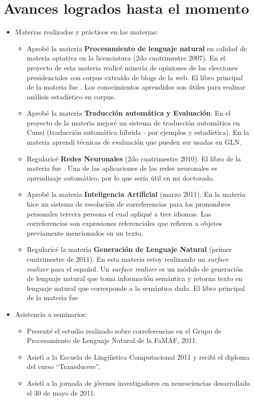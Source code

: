 \section{Avances logrados hasta el momento}
\label{progreso}
\begin{itemize}
\item Materias realizadas y pr\'acticos en las materias:
\begin{itemize}
\item Aprob\'e la materia {\bf Procesamiento de lenguaje natural} en calidad de materia optativa en la licenciatura (2do cuatrimestre 2007). En el proyecto de esta materia realic\'e miner\'ia de opiniones de las elecciones presidenciales con corpus extra\'ido de blogs de la web. El libro principal de la materia fue \cite{Manning2000}. Los conocimientos aprendidos son \'utiles para realizar an\'alisis estad\'istico en corpus.
\item Aprob\'e la materia {\bf Traducci\'on autom\'atica y Evaluaci\'on}. En el proyecto de la materia mejor\'e un sistema de traducci\'on autom\'atica en Cunei (traducci\'on autom\'atica h\'ibrida - por ejemplos y estad\'istica).
En la materia aprend\'i t\'ecnicas de evaluaci\'on que pueden ser usadas en GLN. 
\item Regularic\'e {\bf Redes Neuronales} (2do cuatrimestre 2010). El libro de la materia fue \cite{Hertz1991}. Una de las aplicaciones de las redes neuronales es aprendizaje autom\'atico, por lo que ser\'ia \'util en mi doctorado.
\item Aprob\'e la materia {\bf Inteligencia Artificial} (marzo 2011). En la materia hice un sistema de resoluci\'on de correferencias para los pronombres personales tercera persona el cual apliqu\'e a tres idiomas. Las correferencias son expresiones referenciales que refieren a objetos previamente mencionados en un texto.
\item Regularic\'e la materia {\bf Generaci\'on de Lenguaje Natural} (primer cuatrimestre de 2011). En esta materia estoy realizando un {\it surface realizer} para el espa\~{n}ol. Un {\it surface realizer} es un m\'odulo de generaci\'on de lenguaje natural que toma informaci\'on sem\'antica y retorna texto en lenguaje natural que corresponde a la sem\'antica dada. El libro principal de la materia fue \cite{Reiter2000}
\end{itemize}
\item Asistencia a seminarios:
\begin{itemize}
\item Present\'e el estudio realizado sobre correferencias en el Grupo de Procesamiento de Lenguaje Natural de la FaMAF, 2011.
\item Asist\'{\i} a la Escuela de Ling\"u\'{\i}stica Computacional 2011 y recib\'{\i} el diploma del curso ``Transducers''.
\item Asist\'{\i} a la jornada de j\'ovenes investigadores en neurociencias desarrollada el 30 de mayo de 2011.
\end{itemize}
\end{itemize}
